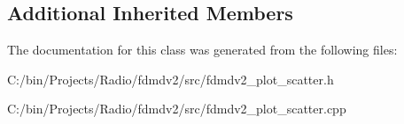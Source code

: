 \subsection*{Additional Inherited Members}


The documentation for this class was generated from the following files\-:\begin{DoxyCompactItemize}
\item 
C\-:/bin/\-Projects/\-Radio/fdmdv2/src/fdmdv2\-\_\-plot\-\_\-scatter.\-h\item 
C\-:/bin/\-Projects/\-Radio/fdmdv2/src/fdmdv2\-\_\-plot\-\_\-scatter.\-cpp\end{DoxyCompactItemize}

